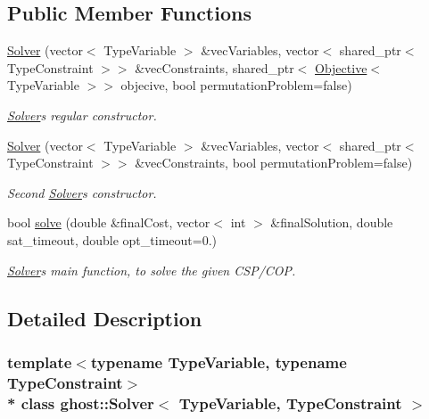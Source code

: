\subsection*{Public Member Functions}
\begin{DoxyCompactItemize}
\item 
\hyperlink{classghost_1_1Solver_afcafbb540e963da0aa0d8bbf5634f6e4}{Solver} (vector$<$ Type\+Variable $>$ \&vec\+Variables, vector$<$ shared\+\_\+ptr$<$ Type\+Constraint $>$$>$ \&vec\+Constraints, shared\+\_\+ptr$<$ \hyperlink{classghost_1_1Objective}{Objective}$<$ Type\+Variable $>$$>$ objecive, bool permutation\+Problem=false)
\begin{DoxyCompactList}\small\item\em \hyperlink{classghost_1_1Solver}{Solver}\textquotesingle{}s regular constructor. \end{DoxyCompactList}\item 
\hyperlink{classghost_1_1Solver_a26fe2a7362fdc6cc44b07e0c658250de}{Solver} (vector$<$ Type\+Variable $>$ \&vec\+Variables, vector$<$ shared\+\_\+ptr$<$ Type\+Constraint $>$$>$ \&vec\+Constraints, bool permutation\+Problem=false)
\begin{DoxyCompactList}\small\item\em Second \hyperlink{classghost_1_1Solver}{Solver}\textquotesingle{}s constructor. \end{DoxyCompactList}\item 
bool \hyperlink{classghost_1_1Solver_ab2f3b79560cefbe8299583a40edad40e}{solve} (double \&final\+Cost, vector$<$ int $>$ \&final\+Solution, double sat\+\_\+timeout, double opt\+\_\+timeout=0.)
\begin{DoxyCompactList}\small\item\em \hyperlink{classghost_1_1Solver}{Solver}\textquotesingle{}s main function, to solve the given C\+S\+P/\+C\+OP. \end{DoxyCompactList}\end{DoxyCompactItemize}


\subsection{Detailed Description}
\subsubsection*{template$<$typename Type\+Variable, typename Type\+Constraint$>$\\*
class ghost\+::\+Solver$<$ Type\+Variable, Type\+Constraint $>$}

